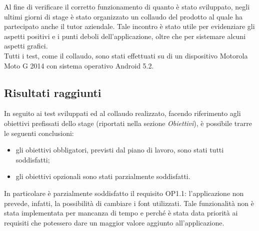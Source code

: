 \documentclass[../Tesi.tex]{subfiles}
\begin{document}
	Al fine di verificare il corretto funzionamento di quanto è stato sviluppato, negli ultimi giorni di stage è stato organizzato un collaudo del prodotto al quale ha partecipato anche il tutor aziendale. Tale incontro è stato utile per evidenziare gli aspetti positivi e i punti deboli dell'applicazione, oltre che per sistemare alcuni aspetti grafici.\\
	Tutti i test, come il collaudo, sono stati effettuati su di un dispositivo Motorola Moto G 2014 con sistema operativo Android 5.2.

	\subsection{Risultati raggiunti}
	In seguito ai test sviluppati ed al collaudo realizzato, facendo riferimento agli obiettivi prefissati dello stage (riportati nella sezione \textit{Obiettivi}), è possibile trarre le seguenti conclusioni:
	\begin{itemize}
		\item gli obiettivi obbligatori, previsti dal piano di lavoro, sono stati tutti soddisfatti;
		\item gli obiettivi opzionali sono stati parzialmente soddisfatti.
	\end{itemize}
	In particolare è parzialmente soddisfatto il requisito OP1.1: l'applicazione non prevede, infatti, la possibilità di cambiare i font utilizzati. Tale funzionalità non è stata implementata per mancanza di tempo e perché è stata data priorità ai requisiti che potessero dare un maggior valore aggiunto all'applicazione.
\end{document}
